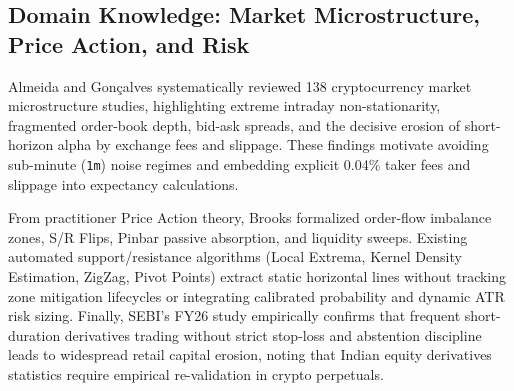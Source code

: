 \documentclass[conference]{IEEEtran}
\begin{document}
\subsection{Domain Knowledge: Market Microstructure, Price Action, and Risk}
Almeida and Gon\c{c}alves \cite{almeida2023} systematically reviewed 138 cryptocurrency market microstructure studies, highlighting extreme intraday non-stationarity, fragmented order-book depth, bid-ask spreads, and the decisive erosion of short-horizon alpha by exchange fees and slippage. These findings motivate avoiding sub-minute (\texttt{1m}) noise regimes and embedding explicit 0.04\% taker fees and slippage into expectancy calculations.

From practitioner Price Action theory, Brooks \cite{brooks2012} formalized order-flow imbalance zones, S/R Flips, Pinbar passive absorption, and liquidity sweeps. Existing automated support/resistance algorithms (Local Extrema, Kernel Density Estimation, ZigZag, Pivot Points) extract static horizontal lines without tracking zone mitigation lifecycles or integrating calibrated probability and dynamic ATR risk sizing. Finally, SEBI's FY26 study \cite{sebi2026} empirically confirms that frequent short-duration derivatives trading without strict stop-loss and abstention discipline leads to widespread retail capital erosion, noting that Indian equity derivatives statistics require empirical re-validation in crypto perpetuals.
\end{document}
